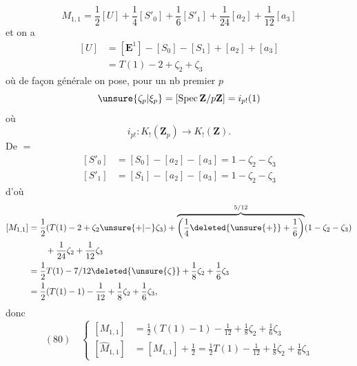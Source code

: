 \[
M_{1,1}=\frac12[U]+\frac14[S'_0]+\frac16[S'_1]+\frac1{24}[a_2]+\frac1{12}[a_3]
\]
et on a
\[
\begin{aligned}
[U]&=[\mathbf E^1]-[S_0]-[S_1]+[a_2]+[a_3]\\
&=T(1)-2+\zeta_2+\zeta_3
\end{aligned}
\]
où de façon générale on pose, pour un nb premier $p$
\[
\unsure{\zeta_p|\xi_p}=[\operatorname{Spec}\mathbf Z/p\mathbf Z]=i_{p!}(1)
\]
où
\[
i_{p!}:K_!(\mathbf Z_p)\longrightarrow K_!(\mathbf Z).
\]
De $=$
\[
\begin{aligned}
[S'_0]&=[S_0]-[a_2]-[a_3]=1-\zeta_2-\zeta_3\\
[S'_1]&=[S_1]-[a_2]-[a_3]=1-\zeta_2-\zeta_3
\end{aligned}
\]
d'où
\[
\begin{aligned}
[M_{1,1}]&=\frac12(T(1)-2+\zeta_2\unsure{+|-}\zeta_3)+\overbrace{\left(\frac14\deleted{\unsure{+}}+\frac16\right)}^{5/12}(1-\zeta_2-\zeta_3)\\
&\qquad+\frac1{24}\zeta_2+\frac1{12}\zeta_3\\
&=\frac12T(1)-7/12\deleted{\unsure{\zeta}}+\frac18\zeta_2+\frac16\zeta_3\\
&=\frac12(T(1)-1)-\frac1{12}+\frac18\zeta_2+\frac16\zeta_3,
\end{aligned}
\]
donc
\[
(80)\quad\left\{\begin{aligned}
[M_{1,1}]&=\frac12(T(1)-1)-\frac1{12}+\frac18\zeta_2+\frac16\zeta_3\\
[\widehat M_{1,1}]&=[M_{1,1}]+\frac12=\frac12T(1)-\frac1{12}+\frac18\zeta_2+\frac16\zeta_3
\end{aligned}\right.
\]
